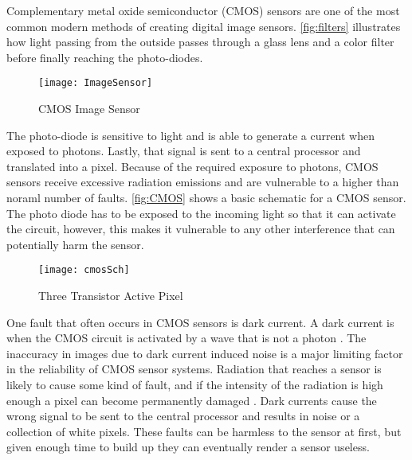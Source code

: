 \par Complementary metal oxide semiconductor (CMOS) sensors are one of the most common modern methods of creating digital image sensors. \autoref{fig:filters} illustrates how light passing from the outside passes through a glass lens and a color filter before finally reaching the photo-diodes.
\begin{figure}[H]
    \texttt{[image: ImageSensor]}
    \caption{CMOS Image Sensor\cite{Tokyo_Electron_Committee}}
    \label{fig:filters}
\end{figure}
\par The photo-diode is sensitive to light and is able to generate a current when exposed to photons. Lastly, that signal is sent to a central processor and translated into a pixel\cite{Tokyo_Electron_Committee}. Because of the required exposure to photons, CMOS sensors receive excessive radiation emissions and are vulnerable to a higher than noraml number of faults. \autoref{fig:CMOS} shows a basic schematic for a CMOS sensor. The photo diode has to be exposed to the incoming light so that it can activate the circuit, however, this makes it vulnerable to any other interference that can potentially harm the sensor.
\begin{figure}[H]
    \texttt{[image: cmosSch]}
    \caption{Three Transistor Active Pixel}
    \label{fig:CMOS}
\end{figure}
\par One fault that often occurs in CMOS sensors is dark current. A dark current is when the CMOS circuit is activated by a wave that is not a photon \cite{mcgrath_tobin_goiffon_magan_2018}. The inaccuracy in images due to dark current induced noise is a major limiting factor in the reliability of CMOS sensor systems. Radiation that reaches a sensor is likely to cause some kind of fault, and if the intensity of the radiation is high enough a pixel can become permanently damaged \cite{bardoux_penquer_gilard_ecoffet_auvergne_2017}. Dark currents cause the wrong signal to be sent to the central processor and results in noise or a collection of white pixels.  These faults can be harmless to the sensor at first, but given enough time to build up they can eventually render a sensor useless.
